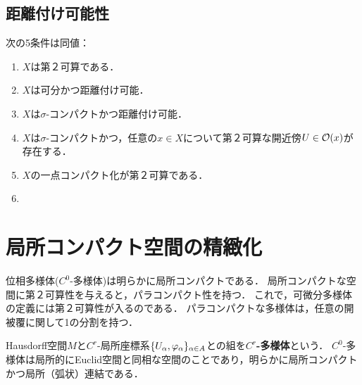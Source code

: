 \documentclass[uplatex,dvipdfmx]{jsreport}
\begin{document}
\subsection{距離付け可能性}

\begin{theorem}
    次の5条件は同値：
    \begin{enumerate}
        \item $X$は第２可算である．
        \item $X$は可分かつ距離付け可能．
        \item $X$は$\sigma$-コンパクトかつ距離付け可能．
        \item $X$は$\sigma$-コンパクトかつ，任意の$x\in X$について第２可算な開近傍$U\in\mathcal{O}(x)$が存在する．
        \item $X$の一点コンパクト化が第２可算である．
        \item 
    \end{enumerate}
\end{theorem}

\section{局所コンパクト空間の精緻化}

\begin{tcolorbox}[colframe=ForestGreen, colback=ForestGreen!10!white,breakable,colbacktitle=ForestGreen!40!white,coltitle=black,fonttitle=\bfseries\sffamily,
    title=]
    位相多様体($C^0$-多様体)は明らかに局所コンパクトである．
    局所コンパクトな空間に第２可算性を与えると，パラコンパクト性を持つ．
    これで，可微分多様体の定義には第２可算性が入るのである．
    パラコンパクトな多様体は，任意の開被覆に関して1の分割を持つ．
\end{tcolorbox}

\begin{definition}[manifold]
    Hausdorff空間$M$と$C^r$-局所座標系$\{U_\alpha,\varphi_\alpha\}_{\alpha\in A}$との組を\textbf{$C^r$-多様体}という．
    $C^0$-多様体は局所的にEuclid空間と同相な空間のことであり，明らかに局所コンパクトかつ局所（弧状）連結である．
\end{definition}
\end{document}
